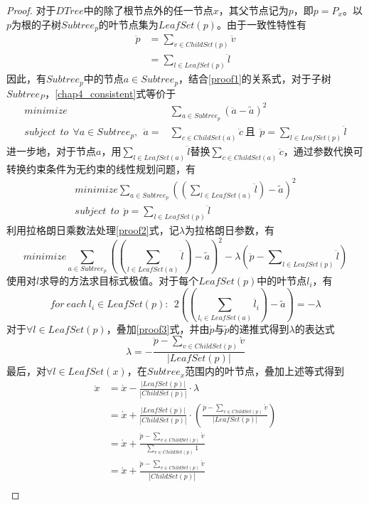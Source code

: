 \begin{proof}
	对于$DTree$中的除了根节点外的任一节点$x$，其父节点记为$p$，即$p = P_{x}$。以$p$为根的子树$Subtree_{p}$的叶节点集为$LeafSet(p)$。由于一致性特性有
	\begin{equation}
		\label{proof1}
		\begin{split}
		\ddot{p} &= \sum\nolimits_{v \in ChildSet(p)} {\ddot{v}}\\
		&= \sum\nolimits_{l \in LeafSet(p)} {\ddot{l}} 
		\end{split}
	\end{equation}
	因此，有$Subtree_{p}$中的节点$a \in Subtree_{p}$，结合\ref{proof1}的关系式，对于子树$Subtree_{P}$，\ref{chap4_consistent}式等价于
	\[
	\begin{split}
	minimize &\sum\limits_{a \in Subtree_{p}} (\ddot{a} - \tilde{a})^2 \\
	subject\ \ to\ \ \forall a\in Subtree_{p},\ \ \ddot{a} = &\sum\limits_{c \in ChildSet(a)} \ddot{c}\ \text{且}\ \ \ddot{p} = \sum\nolimits_{l \in LeafSet(p)} {\ddot{l}} 
	\end{split}		
	\]
	进一步地，对于节点$a$，用$\sum\limits_{l \in LeafSet(a)} \ddot{l}$替换$\sum\limits_{c \in ChildSet(a)} \ddot{c}$，通过参数代换可转换约束条件为无约束的线性规划问题，有
	\begin{equation}
	\label{proof2}
	\begin{split}
	minimize \sum\limits_{a \in Subtree_{p}} ((\sum\limits_{l \in LeafSet(a)} \ddot{l}) - \tilde{a})^2\\
	subject\ \ to\ \ \ddot{p} = \sum\nolimits_{l \in LeafSet(p)} {\ddot{l}} 
	\end{split}		
	\end{equation}
	利用拉格朗日乘数法处理\ref{proof2}式，记$\lambda$为拉格朗日参数，有
	\[
		minimize \sum\limits_{a \in Subtree_{p}} ((\sum\limits_{l \in LeafSet(a)} \ddot{l}) - \tilde{a})^2 - \lambda(\ddot{p} - \sum\nolimits_{l \in LeafSet(p)} {\ddot{l}})
	\]
	使用对$l$求导的方法求目标式极值。对于每个$LeafSet(p)$中的叶节点$l_{i}$，有
	\begin{equation}
	\label{proof3}
	for\ each\  l_{i} \in LeafSet(p):\ \ 2((\sum\limits_{l_{i} \in LeafSet(a)} \ddot{l_{i}}) - \tilde{a}) = -\lambda 
	\end{equation}
	对于$\forall l \in LeafSet(p)$，叠加\ref{proof3}式，并由$\acute{p}$与$\tilde{p}$的递推式得到$\lambda$的表达式
	\[
		\lambda = -\frac{\ddot{p}-\sum\nolimits_{v \in ChildSet(p)} {\acute{v}}}{|LeafSet(p)|}
	\]
	最后，对$\forall l \in LeafSet(x)$，在$Subtree_{x}$范围内的叶节点，叠加上述等式得到
	\[
	\begin{split}
	\ddot{x} &= \acute{x} - \frac{|LeafSet(p)|}{|ChildSet(p)|}\cdotp \lambda \\
		&= \acute{x} + \frac{|LeafSet(p)|}{|ChildSet(p)|}\cdotp (\frac{\ddot{p}-\sum\nolimits_{v \in ChildSet(p)}{\acute{v}}}{|LeafSet(p)|})\\
		&= \acute{x} + \frac{{\ddot{p} - \sum\nolimits_{v \in ChildSet(p)} {\acute{v}}}}{\sum\nolimits_{v \in ChildSet(p)} {1}}\\
		&= \acute{x} + \frac{\ddot{p} - \sum\nolimits_{v \in ChildSet(p)}{\acute{v}}}{|ChildSet(p)|}\\
	\end{split}
	\]
	

\end{proof}
